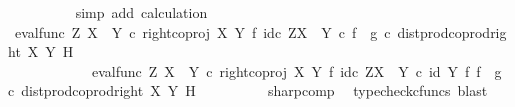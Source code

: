 \begin{isabellebody}
\ \ \ \ \ \ \ \ \isamarkupfalse%
\ {\isacharparenleft}{\kern0pt}simp\ add{\isacharcolon}{\kern0pt}\ calculation{\isacharparenright}{\kern0pt}\isanewline
\ \ \ \ \isamarkupfalse%
\isanewline
\ \ \ \ \ \ \isamarkupfalse%
\ {\isachardoublequoteopen}{\isacharparenleft}{\kern0pt}eval{\isacharunderscore}{\kern0pt}func\ Z\ {\isacharparenleft}{\kern0pt}X\ {\isasymCoprod}\ Y{\isacharparenright}{\kern0pt}\ {\isasymcirc}\isactrlsub c\ right{\isacharunderscore}{\kern0pt}coproj\ X\ Y\ {\isasymtimes}\isactrlsub f\ id\isactrlsub c\ {\isacharparenleft}{\kern0pt}Z\isactrlbsup {\isacharparenleft}{\kern0pt}X\ {\isasymCoprod}\ Y{\isacharparenright}{\kern0pt}\isactrlesup {\isacharparenright}{\kern0pt}{\isacharparenright}{\kern0pt}\isactrlsup {\isasymsharp}\ {\isasymcirc}\isactrlsub c\ {\isacharparenleft}{\kern0pt}f\isactrlsup {\isasymflat}\ {\isasymamalg}\ g\isactrlsup {\isasymflat}\ {\isasymcirc}\isactrlsub c\ dist{\isacharunderscore}{\kern0pt}prod{\isacharunderscore}{\kern0pt}coprod{\isacharunderscore}{\kern0pt}right\ X\ Y\ H{\isacharparenright}{\kern0pt}\isactrlsup {\isasymsharp}\ {\isacharequal}{\kern0pt}\ \isanewline
\ \ \ \ \ \ \ \ \ \ \ \ {\isacharparenleft}{\kern0pt}{\isacharparenleft}{\kern0pt}eval{\isacharunderscore}{\kern0pt}func\ Z\ {\isacharparenleft}{\kern0pt}X\ {\isasymCoprod}\ Y{\isacharparenright}{\kern0pt}\ {\isasymcirc}\isactrlsub c\ right{\isacharunderscore}{\kern0pt}coproj\ X\ Y\ {\isasymtimes}\isactrlsub f\ id\isactrlsub c\ {\isacharparenleft}{\kern0pt}Z\isactrlbsup {\isacharparenleft}{\kern0pt}X\ {\isasymCoprod}\ Y{\isacharparenright}{\kern0pt}\isactrlesup {\isacharparenright}{\kern0pt}{\isacharparenright}{\kern0pt}\ {\isasymcirc}\isactrlsub c\ {\isacharparenleft}{\kern0pt}id\ Y\ {\isasymtimes}\isactrlsub f\ {\isacharparenleft}{\kern0pt}f\isactrlsup {\isasymflat}\ {\isasymamalg}\ g\isactrlsup {\isasymflat}\ {\isasymcirc}\isactrlsub c\ dist{\isacharunderscore}{\kern0pt}prod{\isacharunderscore}{\kern0pt}coprod{\isacharunderscore}{\kern0pt}right\ X\ Y\ H{\isacharparenright}{\kern0pt}\isactrlsup {\isasymsharp}{\isacharparenright}{\kern0pt}{\isacharparenright}{\kern0pt}\isactrlsup {\isasymsharp}{\isachardoublequoteclose}\isanewline
\ \ \ \ \ \ \ \ \isamarkupfalse%
\ sharp{\isacharunderscore}{\kern0pt}comp\ \isamarkupfalse%
\ {\isacharparenleft}{\kern0pt}typecheck{\isacharunderscore}{\kern0pt}cfuncs{\isacharcomma}{\kern0pt}\ blast{\isacharparenright}{\kern0pt}\isanewline
\ \ \ \ \ \ \isamarkupfalse%
\ \isamarkupfalse%

\end{isabellebody}
